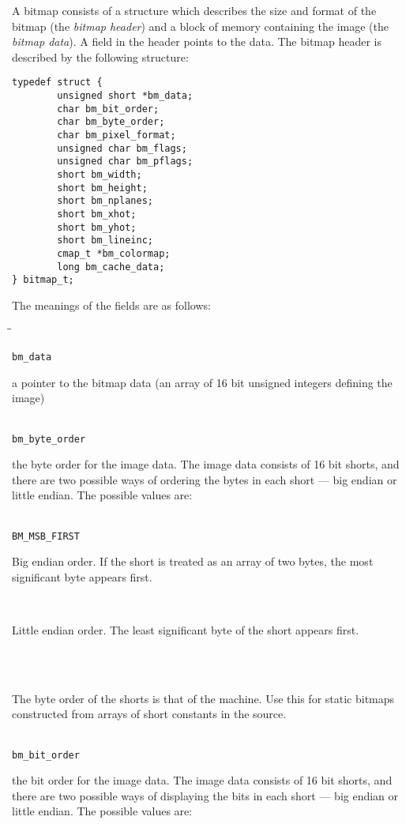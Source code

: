 A bitmap consists of a structure which describes the size and format
of the bitmap (the {\it bitmap header}) and a block of memory
containing the image (the {\it bitmap data}).
A field in the header points to the data.
The bitmap header is described by the following structure:
\begin{verbatim}
typedef struct {
        unsigned short *bm_data;
        char bm_bit_order;
        char bm_byte_order;
        char bm_pixel_format;
        unsigned char bm_flags;
        unsigned char bm_pflags;
        short bm_width;
        short bm_height;
        short bm_nplanes;
        short bm_xhot;
        short bm_yhot;
        short bm_lineinc;
        cmap_t *bm_colormap;
        long bm_cache_data;
} bitmap_t;
\end{verbatim}
The meanings of the fields are as follows:
\begin{tabbing}
\hspace{1.5in}\=\hspace{1.25in}\= \kill

{\tt bm\_data} \>
\parbox[t]{4.75in}{a pointer to the bitmap data
(an array of 16 bit unsigned integers defining the image)} \\[0.1in]

{\tt bm\_byte\_order} \>
\parbox[t]{4.75in}{the byte order for the image data.
The image data consists of 16 bit shorts, and there are two possible
ways of ordering the bytes in each short --- big endian or little
endian.
The possible values are:} \\[0.1in]

\> {\tt BM\_MSB\_FIRST} \>
\parbox[t]{3.5in}{Big endian order.
If the short is treated as an array of two bytes, the most significant byte
appears first.} \\[0.1in]

 \>
\parbox[t]{3.5in}{Little endian order.
The least significant byte of the short appears first.} \\[0.1in]

 \\ \>\>
\parbox[t]{3.5in}{The byte order of the shorts is that of the machine.
Use this for static bitmaps constructed from arrays of short constants in
the source.} \\[0.1in]

{\tt bm\_bit\_order} \>
\parbox[t]{4.75in}{the bit order for the image data.
The image data consists of 16 bit shorts, and there are two possible
ways of displaying the bits in each short --- big endian or little
endian.
The possible values are:} \\[0.1in]


\end{tabbing}
